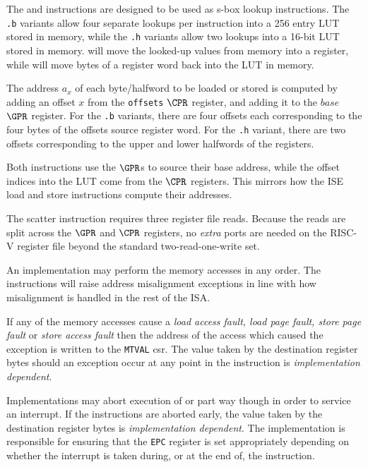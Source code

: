 {\iencscatterb\iencscatterh\iencgatherb\iencgatherh}
{\label{sec:scatter-gather}
The  and  instructions are designed to be used as
s-box lookup instructions. The {\tt .b} variants allow four separate lookups
per instruction into a 256 entry LUT stored in memory, while the {\tt .h}
variants allow two lookups into a 16-bit LUT stored in memory. 
will move the looked-up values from memory into a register, while 
will move bytes of a register word back into the LUT in memory.

The address $a_x$ of each byte/halfword to be loaded or stored is computed by
adding an offset $x$ from the {\tt offsets} $\CPR$ register, and adding it
to the $base$ $\GPR$ register. For the {\tt .b} variants, there are four
offsets each corresponding to the four bytes of the offsets source register
word. For the {\tt .h} variant, there are two offsets corresponding to the
upper and lower halfwords of the registers.

Both instructions use the $\GPR$s to source their base address, while the
offset indices into the LUT come from the $\CPR$ registers. This mirrors
how the ISE load and store instructions compute their addresses.

The scatter instruction requires three register file reads.
Because the reads are split across the $\GPR$ and $\CPR$ registers,
no {\em extra} ports are needed on the RISC-V register file beyond the
standard two-read-one-write set.

An implementation may perform the memory accesses in any order. The instructions
will raise address misalignment exceptions in line with how misalignment is
handled in the rest of the ISA.

If any of the memory accesses cause
a {\em load access fault, load page fault, store page fault} or
{\em store access fault} then the address of the access which caused the
exception is written to the {\tt MTVAL} csr. The value taken by the
destination register bytes should an exception occur at any point in the
instruction is {\em implementation dependent}.

Implementations may abort execution of  or  part way
though in order to service an interrupt. If the instructions are aborted
early, the value taken by the destination register bytes is {\em
implementation dependent}. The implementation is responsible for ensuring
that the {\tt EPC} register is set appropriately depending on whether the
interrupt is taken during, or at the end of, the instruction.

}
